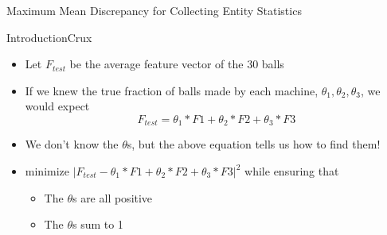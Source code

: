 \documentclass{beamer}
\begin{document}
\begin{frame}
\begin{center}
 
\Huge Maximum Mean Discrepancy for Collecting Entity Statistics

\end{center}

 \end{frame}
\begin{frame}{Introduction}{Crux}
 \begin{itemize}
  \item Let $F_{test}$ be the average feature vector of the 30 balls \medskip
  \item If we knew the true fraction of balls made by each machine, $\theta_1, \theta_2, \theta_3$, we would expect \medskip
  \begin{equation}
   F_{test} = \theta_1 * F1 + \theta_2 * F2 + \theta_3 * F3
  \end{equation}
\item We don't know the $\theta$s, but the above equation tells us how to find them! \medskip
\item minimize $|F_{test} - \theta_1 * F1 + \theta_2 * F2 + \theta_3 * F3|^2$ while ensuring that
\begin{itemize}
 \item The $\theta$s are all positive
 \item The $\theta$s sum to 1
\end{itemize}

 \end{itemize}
 

\end{frame}

 
\end{document}
